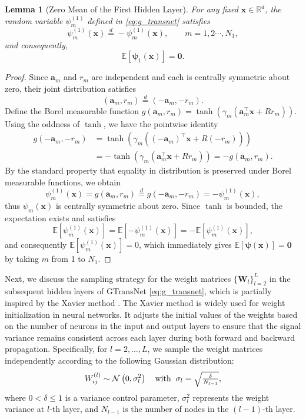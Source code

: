 \documentclass{article}
\newcommand{\ba}{\mathbf{a}}
\newcommand{\bx}{\mathbf{x}}
\newcommand{\bW}{\mathbf{W}}
\newcommand{\vpsi}{\boldsymbol{\psi}}
\newtheorem{lemma}{Lemma}
\begin{document}
\begin{lemma}[Zero Mean of the First Hidden Layer]\label{lem:1}
For any fixed $\bx \in \mathbb{R}^d$, the random variable $\psi^{(1)}_m$ defined in \eqref{eq:g_transnet} satisfies
\begin{equation}\label{eq:CS_psi}
\psi^{(1)}_m(\bx) \stackrel{d}{=} -\psi^{(1)}_m(\bx),\qquad m=1,2\cdots, {N_1},
\end{equation}
and consequently, 
\begin{equation}
\mathbb{E}[\vpsi_1(\bx)] = \mathbf{0}.
\end{equation}
\end{lemma}
\begin{proof}
Since $\ba_m$ and $r_m$ are independent and each is centrally symmetric about zero, their joint distribution satisfies
\begin{equation}\label{eq:CS1}
(\ba_m, r_m) \stackrel{d}{=} (-\ba_m, -r_m).
\end{equation}
Define the Borel measurable function $g(\ba_m,r_m)= \tanh(\gamma_m(\ba_m^\top \bx + Rr_m))$. Using the oddness of $\tanh$, we have the pointwise identity
\begin{equation}
\begin{aligned}
g(-\ba_m, -r_m) &= \tanh(\gamma_m((-\ba_m)^\top \bx + R(-r_m))) 
\\
&= -\tanh(\gamma_m(\ba_m^\top \bx + Rr_m)) = -g(\ba_m,r_m).
\end{aligned}
\end{equation}
By the standard property that equality in distribution is preserved under Borel measurable functions, we obtain
\[
\psi^{(1)}_m(\bx) = g(\ba_m,r_m) \stackrel{d}{=} g(-\ba_m,-r_m) = -\psi^{(1)}_m(\bx),
\]
thus $\psi_m(\bx)$ is centrally symmetric about zero. 
Since $\tanh$ is bounded, the expectation exists and satisfies
\[
\mathbb{E}[\psi^{(1)}_m(\bx)] = \mathbb{E}[-\psi^{(1)}_m(\bx)] = -\mathbb{E}[\psi^{(1)}_m(\bx)],
\]
and consequently  $\mathbb{E}[\psi^{(1)}_m(\bx)] = 0$, which immediately gives $\mathbb{E}[\vpsi(\bx)] = \mathbf{0}$ by taking $m$ from 1 to ${N_1}$.
\end{proof}

Next, we discuss the sampling strategy for the weight matrices $\{\bW_l\}_{l=2}^{L}$ in the subsequent hidden layers of GTransNet \eqref{eq:g_transnet}, which is partially inspired by the Xavier method \cite{Xavier}. The Xavier method is widely used for weight initialization in neural networks. It adjusts the initial values of the weights based on the number of neurons in the input and output layers to ensure that the signal variance remains consistent across each layer during both forward and backward propagation.
Specifically, for $l = 2, \dots, L$, we sample the weight matrices independently according to the following Gaussian distribution:
\begin{equation}\label{eq:sample_W}
W_{ij}^{(l)} \sim \mathcal{N} \left(0,\sigma_l^2\right)
\quad{\rm with}\;\;
\sigma_l = \textstyle\sqrt{\frac{\delta}{N_{l-1}}},
\end{equation}
where $0 < \delta \le 1$ is a variance control parameter, $\sigma_l^2$ represents the weight variance at $l$-th layer, and $N_{l-1}$ is the number of nodes in the $(l-1)$-th layer.
\end{document}
